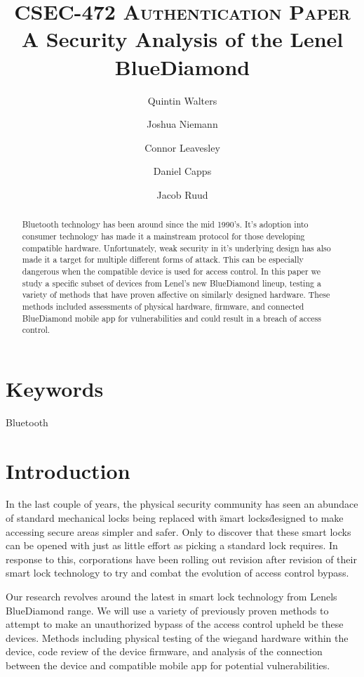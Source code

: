 \documentclass[10pt,twocolumn,letterpaper]{article}
\title{
		\vspace{-1in} 	
		\usefont{OT1}{bch}{b}{n}
		\normalfont \normalsize \textsc{CSEC-472 Authentication Paper} \\ [14pt]
		\huge A Security Analysis of the Lenel BlueDiamond \\
}
\author[1]{Quintin Walters}
\author[1]{Joshua Niemann}
\author[1]{Connor Leavesley}
\author[1]{Daniel Capps}
\author[1]{Jacob Ruud}
\affil[1]{\small{Computing Security, Rochester Institute of Technology}}
\begin{document}
\maketitle
{}
\begin{abstract}

Bluetooth technology has been around since the mid 1990's. It's adoption into consumer technology has made it a mainstream protocol for those developing compatible hardware. Unfortunately, weak security in it's underlying design has also made it a target for multiple different forms of attack. This can be especially dangerous when the compatible device is used for access control. In this paper we study a specific subset of devices from Lenel's new BlueDiamond lineup, testing a variety of methods that have proven affective on similarly designed hardware. These methods included assessments of physical hardware, firmware, and connected BlueDiamond mobile app for vulnerabilities and could result in a breach of access control.

\end{abstract} 

\section{Keywords}

Bluetooth

\section{Introduction}

In the last couple of years, the physical security community has seen an abundace of standard mechanical locks being replaced with \"smart locks\" designed to make accessing secure areas simpler and safer. Only to discover that these smart locks can be opened with just as little effort as picking a standard lock requires. In response to this, corporations have been rolling out revision after revision of their smart lock technology to try and combat the evolution of access control bypass.

Our research revolves around the latest in smart lock technology from Lenels BlueDiamond range. We will use a variety of previously proven methods to attempt to make an unauthorized bypass of the access control upheld be these devices. Methods including physical testing of the wiegand hardware within the device, code review of the device firmware, and analysis of the connection between the device and compatible mobile app for potential vulnerabilities.
\end{document}
